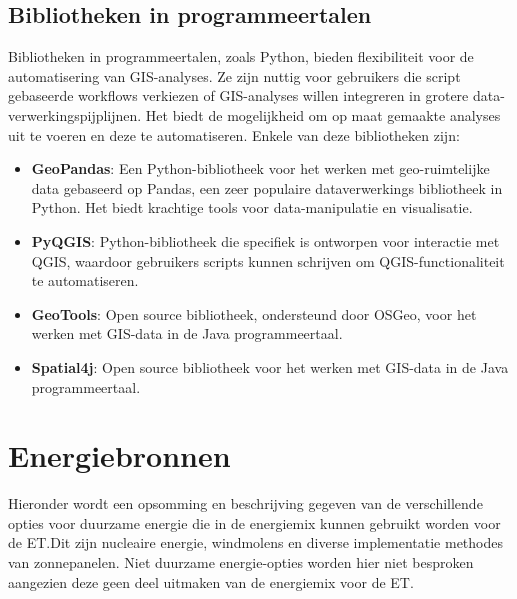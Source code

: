 \subsection{Bibliotheken in programmeertalen}
Bibliotheken in programmeertalen, zoals Python, bieden flexibiliteit voor de automatisering van GIS-analyses. Ze zijn nuttig voor gebruikers die script gebaseerde workflows verkiezen of GIS-analyses willen integreren in grotere data-verwerkingspijplijnen. Het biedt de mogelijkheid om op maat gemaakte analyses uit te voeren en deze te automatiseren. Enkele van deze bibliotheken zijn:

\begin{itemize}
    \item \textbf{GeoPandas}: Een Python-bibliotheek voor het werken met geo-ruimtelijke data gebaseerd op Pandas, een zeer populaire dataverwerkings bibliotheek in Python. Het biedt krachtige tools voor data-manipulatie en visualisatie.
    \item \textbf{PyQGIS}: Python-bibliotheek die specifiek is ontworpen voor interactie met QGIS, waardoor gebruikers scripts kunnen schrijven om QGIS-functionaliteit te automatiseren.
    \item \textbf{GeoTools}: Open source bibliotheek, ondersteund door OSGeo, voor het werken met GIS-data in de Java programmeertaal.
    \item \textbf{Spatial4j}: Open source bibliotheek voor het werken met GIS-data in de Java programmeertaal.
\end{itemize}

\section{Energiebronnen}\label{sec:energiebronnen}
Hieronder wordt een opsomming en beschrijving gegeven van de verschillende opties voor duurzame energie die in de energiemix kunnen gebruikt worden voor de ET.\@ Dit zijn nucleaire energie, windmolens en diverse implementatie methodes van zonnepanelen. Niet duurzame energie-opties worden hier niet besproken aangezien deze geen deel uitmaken van de energiemix voor de ET.


